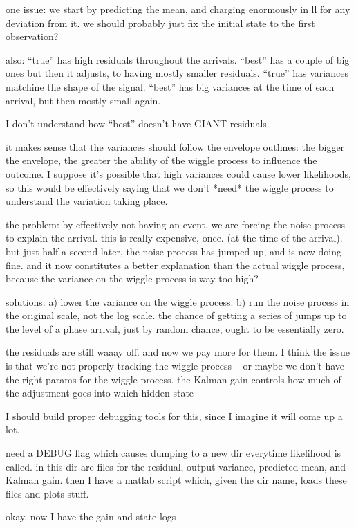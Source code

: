 \documentclass{article}
\begin{document}
one issue: we start by predicting the mean, and charging enormously in ll for any deviation from it. we should probably just fix the initial state to the first observation?

also:
``true'' has high residuals throughout the arrivals. ``best'' has a couple of big ones but then it adjusts, to having mostly smaller residuals.
``true'' has variances matchine the shape of the signal. ``best'' has big variances at the time of each arrival, but then mostly small again.

I don't understand how ``best'' doesn't have GIANT residuals. 

it makes sense that the variances should follow the envelope outlines: the bigger the envelope, the greater the ability of the wiggle process to influence the outcome. 
I suppose it's possible that high variances could cause lower likelihoods, so this would be effectively saying that we don't *need* the wiggle process to understand the variation taking place.

the problem:  by effectively not having an event, we are forcing the noise process to explain the arrival. this is really expensive, once. (at the time of the arrival). but just half a second later, the noise process has jumped up, and is now doing fine. and it now constitutes a better explanation than the actual wiggle process, because the variance on the wiggle process is way too high?

solutions:
a) lower the variance on the wiggle process.
b) run the noise process in the original scale, not the log scale. the chance of getting a series of jumps up to the level of a phase arrival, just by random chance, ought to be essentially zero.

the residuals are still waaay off. and now we pay more for them.
I think the issue is that we're not properly tracking the wiggle process -- or maybe we don't have the right params for the wiggle process. 
the Kalman gain controls how much of the adjustment goes into which hidden state


I should build proper debugging tools for this, since I imagine it will come up a lot.

need a DEBUG flag which causes dumping to a new dir everytime likelihood is called.
in this dir are files for the residual, output variance, predicted mean, and Kalman gain.
then I have a matlab script which, given the dir name, loads these files and plots stuff.

okay, now I have the gain and state logs
\end{document}
